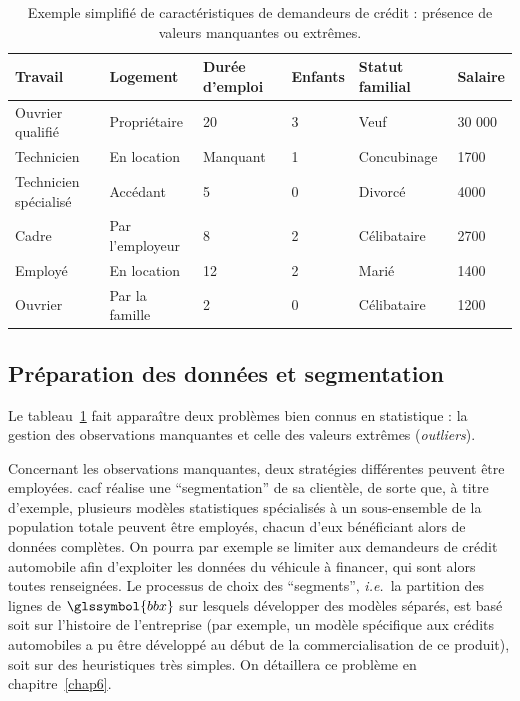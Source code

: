 \begin{table}
\centering
\caption{\label{tab:design} Exemple simplifié de caractéristiques de demandeurs de crédit : présence de valeurs manquantes ou extrêmes.}
\begin{tabular}{l|l|l|l|l|l}
Travail & Logement & Durée d'emploi & Enfants & Statut familial & Salaire \\
\hline
Ouvrier qualifié & Propriétaire & 20 & 3 & Veuf & 30 000  \\
Technicien & En location & Manquant & 1 & Concubinage & {1700}  \\
Technicien spécialisé & Accédant & 5 & 0 & Divorcé & {4000}  \\
Cadre & Par l'employeur & 8 & 2 & Célibataire & {2700}  \\
Employé & En location & 12 & 2 & Marié & {1400}  \\
Ouvrier & Par la famille & 2 & 0 & Célibataire & {1200}  \\
\end{tabular}
\end{table}

\subsection{Préparation des données et segmentation} \label{subsec:segmentation}

Le tableau~\ref{tab:design} fait apparaître deux problèmes bien connus en statistique : la gestion des observations manquantes et celle des valeurs extrêmes (\textit{outliers}).

Concernant les observations manquantes, deux stratégies différentes peuvent être employées. \gls{cacf} réalise une ``segmentation'' de sa clientèle, de sorte que, à titre d'exemple, plusieurs modèles statistiques spécialisés à un sous-ensemble de la population totale peuvent être employés, chacun d'eux bénéficiant alors de données complètes. On pourra par exemple se limiter aux demandeurs de crédit automobile afin d'exploiter les données du véhicule à financer, qui sont alors toutes renseignées. Le processus de choix des ``segments'', \textit{i.e.}\ la partition des lignes de $\glssymbol{bbx}$ sur lesquels développer des modèles séparés, est basé soit sur l'histoire de l'entreprise (par exemple, un modèle spécifique aux crédits automobiles a pu être développé au début de la commercialisation de ce produit), soit sur des heuristiques très simples. On détaillera ce problème en chapitre~\ref{chap6}.

